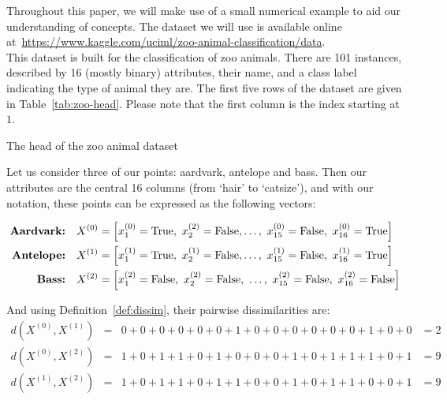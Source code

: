 \begin{example}\label{ex:dissim}
    Throughout this paper, we will make use of a small numerical example to aid 
    our understanding of concepts. The dataset we will use is available online 
    at~\url{https://www.kaggle.com/uciml/zoo-animal-classification/data}.\\

    This dataset is built for the classification of zoo animals. There are 101
    instances, described by 16 (mostly binary) attributes, their name, and a 
    class label indicating the type of animal they are. The first five rows of 
    the dataset are given in Table~\ref{tab:zoo-head}. Please note that the
    first column is the index starting at \(1\).\\
    
    \begin{table}[h]
    \resizebox{\textwidth}{!}{%
        \centering
        
    }
    \caption{The head of the zoo animal dataset}\label{tab:zoo-head}
    \end{table}

    Let us consider three of our points: aardvark, antelope and bass. Then our
    attributes are the central 16 columns (from `hair' to `catsize'), and with 
    our notation, these points can be expressed as the following vectors:

    \begin{equation}
    \nonumber
    \begin{aligned}
        \textbf{Aardvark:} \quad & X^{(0)} = \left[x_1^{(0)} = \true, \ 
            x_2^{(2)} = \false, \ldots, \ x_{15}^{(0)} = \false, \ x_{16}^{(0)} 
            = \true\right]
        \\
        \textbf{Antelope:} \quad & X^{(1)} = \left[x_1^{(1)} = \true, \
            x_2^{(1)} = \false, \ldots, \ x_{15}^{(1)} = \false, \ x_{16}^{(1)} 
            = \true\right]
        \\
        \textbf{Bass:} \quad & X^{(2)} = \left[x_1^{(2)} = \false, \ x_2^{(2)} = 
            \false, \ \ldots, \ x_{15}^{(2)} = \false, \ x_{16}^{(2)} = 
            \false\right]
        \\
    \end{aligned}
    \end{equation}

    And using Definition~\ref{def:dissim}, their pairwise dissimilarities are:
    \begin{equation}
    \nonumber
    \begin{aligned}
        d(X^{(0)}, X^{(1)}) & = & 0 + 0 + 0 + 0 + 0 + 0 + 1 + 0 + 0 + 0 + 0 + 0 
        + 0 + 1 + 0 + 0 & = 2
        \\
        d(X^{(0)}, X^{(2)}) & = & 1 + 0 + 1 + 1 + 0 + 1 + 0 + 0 + 0 + 1 + 0 + 1 
        + 1 + 1 + 0 + 1 & = 9
        \\
        d(X^{(1)}, X^{(2)}) & = & 1 + 0 + 1 + 1 + 0 + 1 + 1 + 0 + 0 + 1 + 0 + 1
        + 1 + 0 + 0 + 1 & = 9
        \\
    \end{aligned}
    \end{equation}
    \\
\end{example}

